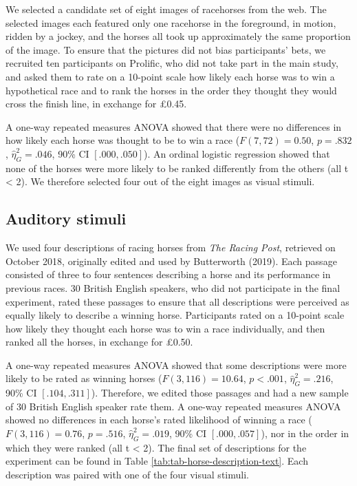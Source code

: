 \documentclass[
  man,floatsintext]{apa7}
\begin{document}
We selected a candidate set of eight images of racehorses from the web. The selected images each featured only one racehorse in the foreground, in motion, ridden by a jockey, and the horses all took up approximately the same proportion of the image. To ensure that the pictures did not bias participants' bets, we recruited ten participants on Prolific, who did not take part in the main study, and asked them to rate on a 10-point scale how likely each horse was to win a hypothetical race and to rank the horses in the order they thought they would cross the finish line, in exchange for £0.45.

A one-way repeated measures ANOVA showed that there were no differences in how likely each horse was thought to be to win a race (\(F(7, 72) = 0.50\), \(p = .832\), \(\hat{\eta}^2_G = .046\), 90\% CI \([.000, .050]\)). An ordinal logistic regression showed that none of the horses were more likely to be ranked differently from the others (all \textbar t\textbar{} \textless{} 2). We therefore selected four out of the eight images as visual stimuli.

\hypertarget{auditory-stimuli}{%
\subsection{Auditory stimuli}\label{auditory-stimuli}}

We used four descriptions of racing horses from \emph{The Racing Post}, retrieved on October 2018, originally edited and used by Butterworth (2019). Each passage consisted of three to four sentences describing a horse and its performance in previous races. 30 British English speakers, who did not participate in the final experiment, rated these passages to ensure that all descriptions were perceived as equally likely to describe a winning horse. Participants rated on a 10-point scale how likely they thought each horse was to win a race individually, and then ranked all the horses, in exchange for £0.50.

A one-way repeated measures ANOVA showed that some descriptions were more likely to be rated as winning horses (\(F(3, 116) = 10.64\), \(p < .001\), \(\hat{\eta}^2_G = .216\), 90\% CI \([.104, .311]\)). Therefore, we edited those passages and had a new sample of 30 British English speaker rate them. A one-way repeated measures ANOVA showed no differences in each horse's rated likelihood of winning a race (\(F(3, 116) = 0.76\), \(p = .516\), \(\hat{\eta}^2_G = .019\), 90\% CI \([.000, .057]\)), nor in the order in which they were ranked (all \textbar t\textbar{} \textless{} 2). The final set of descriptions for the experiment can be found in Table \ref{tab:tab-horse-description-text}. Each description was paired with one of the four visual stimuli.
\end{document}
